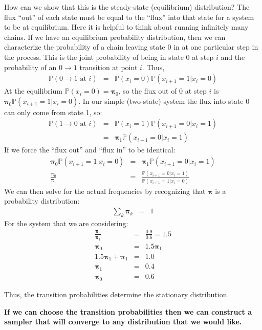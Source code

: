 \documentclass[11pt]{article}
\renewcommand{\Pr}{{\mathbb P}}
\begin{document}
How can we show that this is the steady-state (equilibrium) distribution?
The flux ``out'' of each state must be equal to the ``flux'' into that state for a system to be at equilibrium.
Here it is helpful to think about running infinitely many chains.
If we have an equilibrium probability distribution, then we can characterize the probability of a chain leaving state 0 in at one particular step in the process.
This is the joint probability of being in state 0 at step $i$ and the probability of an $0 \rightarrow 1 $ transition at point $i$.
Thus,
\begin{eqnarray*}
	\Pr(0 \rightarrow 1 \mbox{ at } i) & = & \Pr(x_i = 0)\Pr(x_{i+1} = 1| x_i = 0)
\end{eqnarray*}
At the equilibrium $ \Pr(x_i = 0) = \bm \pi_0$, so the flux out of 0 at step $i$ is $\bm \pi_0 \Pr(x_{i+1} = 1| x_i = 0)$.
In our simple (two-state) system the flux into state 0 can only come from state 1, so:
\begin{eqnarray*}
	\Pr(1 \rightarrow 0 \mbox{ at } i) & = & \Pr(x_i = 1)\Pr(x_{i+1} = 0| x_i = 1) \\
		& = & \bm \pi_1\Pr(x_{i+1} = 0| x_i = 1) 
\end{eqnarray*}
If we force the ``flux out'' and ``flux in'' to be identical:
\begin{eqnarray*}
	\bm \pi_0 \Pr(x_{i+1} = 1| x_i = 0) & = & \bm \pi_1\Pr(x_{i+1} = 0| x_i = 1) \\
	\frac{\bm \pi_0}{\bm \pi_1} & = & \frac{\Pr(x_{i+1} = 0| x_i = 1)}{\Pr(x_{i+1} = 1| x_i = 0)} 
\end{eqnarray*}
We can then solve for the actual frequencies by recognizing that $\bm \pi$ is a probability distribution:
\begin{eqnarray*}
	\sum_k \bm \pi_k & = & 1
\end{eqnarray*}
For the system that we are considering:
\begin{eqnarray*}
	\frac{\bm \pi_0}{\bm \pi_1} & = & \frac{0.9}{0.6} = 1.5  \\
	\bm \pi_0 & = & 1.5\bm \pi_1 \\
	1.5\bm \pi_1 + \bm \pi_1 & = & 1.0 \\
	\bm \pi_1 & = & 0.4 \\
	\bm \pi_0 & = &  0.6
\end{eqnarray*}

Thus, the transition probabilities determine the stationary distribution.

{\bf If we can choose the transition probabilities then we can construct a sampler that will converge to any distribution that we would like.}
\end{document}
